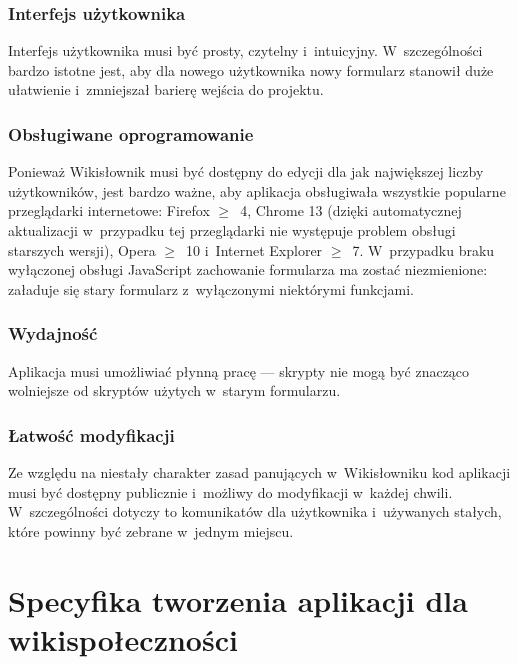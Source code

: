 \subsubsection{Interfejs użytkownika}
Interfejs użytkownika musi być prosty, czytelny i~intuicyjny. W~szczególności bardzo istotne jest, aby dla nowego użytkownika nowy formularz stanowił duże ułatwienie i~zmniejszał barierę wejścia do projektu.

\subsubsection{Obsługiwane oprogramowanie}
Ponieważ Wikisłownik musi być dostępny do edycji dla jak największej liczby użytkowników, jest bardzo ważne, aby aplikacja obsługiwała wszystkie popularne przeglądarki internetowe: Firefox $\geq$~4, Chrome 13 (dzięki automatycznej aktualizacji w~przypadku tej przeglądarki nie występuje problem obsługi starszych wersji), Opera $\geq$~10 i~Internet Explorer $\geq$~7. W~przypadku braku wyłączonej obsługi JavaScript zachowanie formularza ma zostać niezmienione: załaduje się stary formularz z~wyłączonymi niektórymi funkcjami.

\subsubsection{Wydajność}
Aplikacja musi umożliwiać płynną pracę --- skrypty nie mogą być znacząco wolniejsze od skryptów użytych w~starym formularzu.

\subsubsection{Łatwość modyfikacji}
Ze względu na niestały charakter zasad panujących w~Wikisłowniku kod aplikacji musi być dostępny publicznie i~możliwy do modyfikacji w~każdej chwili. W~szczególności dotyczy to komunikatów dla użytkownika i~używanych stałych, które powinny być zebrane w~jednym miejscu.

\section{Specyfika tworzenia aplikacji dla wikispołeczności}
\label{sec:spec}
